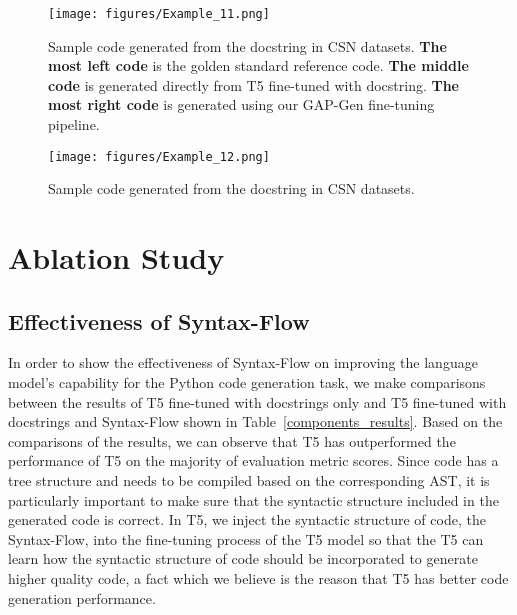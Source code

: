 \documentclass[11pt]{article}
\begin{document}
\begin{figure*}[h!] 
\centering
\texttt{[image: figures/Example\_11.png]}
\caption{Sample code generated from the docstring in CSN datasets. \textbf{The most left code} is the golden standard reference code. \textbf{The middle code} is generated directly from T5 fine-tuned with docstring. \textbf{The most right code} is generated using our GAP-Gen fine-tuning pipeline.}
\label{fig:example_4}
\end{figure*}


\begin{figure*}[h!] 
\centering
\texttt{[image: figures/Example\_12.png]}
\caption{Sample code generated from the docstring in CSN datasets.}
\label{fig:example_5}
\end{figure*}




\section{Ablation Study}








\subsection{Effectiveness of Syntax-Flow}
In order to show the effectiveness of Syntax-Flow on improving the language model's capability for the Python code generation task, we make comparisons between the results of T5 fine-tuned with docstrings only and T5 fine-tuned with docstrings and Syntax-Flow shown in Table~\ref{components_results}. Based on the comparisons of the results, we can observe that T5 has outperformed the performance of T5 on the majority of evaluation metric scores.  Since code has a tree structure and needs to be compiled based on the corresponding AST, it is particularly important to make sure that the syntactic structure included in the generated code is correct. In T5, we inject the syntactic structure of code, the Syntax-Flow, into the fine-tuning process of the T5 model so that the T5 can learn how the syntactic structure of code should be incorporated to generate higher quality code, a fact which we believe is the reason that T5 has better code generation performance. 
\end{document}
